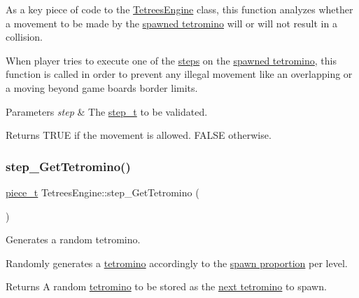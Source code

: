 As a key piece of code to the \hyperlink{classTetreesEngine}{Tetrees\+Engine} class, this function analyzes whether a movement to be made by the \hyperlink{classTetreesEngine_a26435ee2f02d9ba70d9e359745114f6e}{spawned tetromino} will or will not result in a collision.

When player tries to execute one of the \hyperlink{TetreesDefs_8hpp_a4d5a793092a473f85b4c1f7faf62afed}{steps} on the \hyperlink{classTetreesEngine_a26435ee2f02d9ba70d9e359745114f6e}{spawned tetromino}, this function is called in order to prevent any illegal movement like an overlapping or a moving beyond game board\textquotesingle{}s border limits. 
\begin{DoxyParams}{Parameters}
{\em step} & The \hyperlink{TetreesDefs_8hpp_a4d5a793092a473f85b4c1f7faf62afed}{step\+\_\+t} to be validated. \\
\hline
\end{DoxyParams}
\begin{DoxyReturn}{Returns}
{\ttfamily T\+R\+UE} if the movement is allowed. {\ttfamily F\+A\+L\+SE} otherwise. 
\end{DoxyReturn}
\mbox{\label{classTetreesEngine_a94d5fd25eec05994f02bb514496ec66d}} 
\subsubsection{\texorpdfstring{step\+\_\+\+Get\+Tetromino()}{step\_GetTetromino()}}
{\footnotesize\ttfamily \hyperlink{structpiece__t}{piece\+\_\+t} Tetrees\+Engine\+::step\+\_\+\+Get\+Tetromino (\begin{DoxyParamCaption}{ }\end{DoxyParamCaption})\hspace{0.3cm}{\ttfamily [private]}}



Generates a random tetromino. 

Randomly generates a \hyperlink{structpiece__t}{tetromino} accordingly to the \hyperlink{TetreesDefs_8hpp_t_prop}{spawn proportion} per level. \begin{DoxyReturn}{Returns}
A random \hyperlink{structpiece__t}{tetromino} to be stored as the \hyperlink{classTetreesEngine_a44c902481f5d8a72ca8a78d24f5c3a33}{next tetromino} to spawn. 
\end{DoxyReturn}
\mbox{\label{classTetreesEngine_a270b227c9dfbfb72513c6cdfdd910d1b}} 
